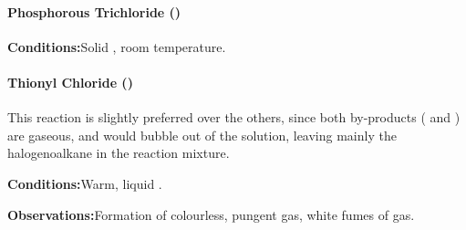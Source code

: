 

				\paragraph{Phosphorous Trichloride ()}

				\vspace{1.5em}
				\vbox{\textbf{Conditions:}\tabto{35mm}Solid , room temperature.}


				\pagebreak
				\paragraph{Thionyl Chloride ()}

				This reaction is slightly preferred over the others, since both by-products ( and ) are
				gaseous, and would bubble out of the solution, leaving mainly the halogenoalkane in the reaction mixture.

				\vspace{1.5em}
				\vbox{\textbf{Conditions:}\tabto{35mm}Warm, liquid .}

				\vspace{0.75em}
				\vbox{\textbf{Observations:}\tabto{35mm}Formation of colourless, pungent  gas,
											\tabto{35mm}white fumes of  gas.}

